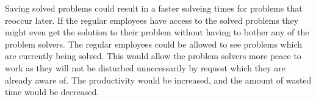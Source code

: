 Saving solved problems could result in a faster solveing times for problems that reoccur later.
If the regular employees have access to the solved problems they might even get the solution to their problem without having to bother any of the problem solvers.
The regular employees could be allowed to see problems which are currently being solved. This would allow the problem solvers more peace to work as they will not be disturbed unnecessarily by request which they are already aware of. The productivity would be increased, and the amount of wasted time would be decreased.







